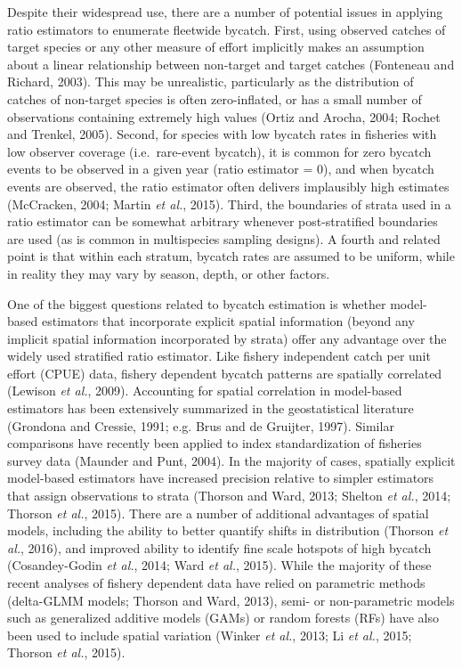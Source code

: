 \documentclass[]{article}
\begin{document}
Despite their widespread use, there are a number of potential issues in
applying ratio estimators to enumerate fleetwide bycatch. First, using
observed catches of target species or any other measure of effort
implicitly makes an assumption about a linear relationship between
non-target and target catches (Fonteneau and Richard, 2003). This may be
unrealistic, particularly as the distribution of catches of non-target
species is often zero-inflated, or has a small number of observations
containing extremely high values (Ortiz and Arocha, 2004; Rochet and
Trenkel, 2005). Second, for species with low bycatch rates in fisheries
with low observer coverage (i.e.~rare-event bycatch), it is common for
zero bycatch events to be observed in a given year (ratio estimator =
0), and when bycatch events are observed, the ratio estimator often
delivers implausibly high estimates (McCracken, 2004; Martin \emph{et
al.}, 2015). Third, the boundaries of strata used in a ratio estimator
can be somewhat arbitrary whenever post-stratified boundaries are used
(as is common in multispecies sampling designs). A fourth and related
point is that within each stratum, bycatch rates are assumed to be
uniform, while in reality they may vary by season, depth, or other
factors.

One of the biggest questions related to bycatch estimation is whether
model-based estimators that incorporate explicit spatial information
(beyond any implicit spatial information incorporated by strata) offer
any advantage over the widely used stratified ratio estimator. Like
fishery independent catch per unit effort (CPUE) data, fishery dependent
bycatch patterns are spatially correlated (Lewison \emph{et al.}, 2009).
Accounting for spatial correlation in model-based estimators has been
extensively summarized in the geostatistical literature (Grondona and
Cressie, 1991; e.g. Brus and de Gruijter, 1997). Similar comparisons
have recently been applied to index standardization of fisheries survey
data (Maunder and Punt, 2004). In the majority of cases, spatially
explicit model-based estimators have increased precision relative to
simpler estimators that assign observations to strata (Thorson and Ward,
2013; Shelton \emph{et al.}, 2014; Thorson \emph{et al.}, 2015). There
are a number of additional advantages of spatial models, including the
ability to better quantify shifts in distribution (Thorson \emph{et
al.}, 2016), and improved ability to identify fine scale hotspots of
high bycatch (Cosandey-Godin \emph{et al.}, 2014; Ward \emph{et al.},
2015). While the majority of these recent analyses of fishery dependent
data have relied on parametric methods (delta-GLMM models; Thorson and
Ward, 2013), semi- or non-parametric models such as generalized additive
models (GAMs) or random forests (RFs) have also been used to include
spatial variation (Winker \emph{et al.}, 2013; Li \emph{et al.}, 2015;
Thorson \emph{et al.}, 2015).
\end{document}
